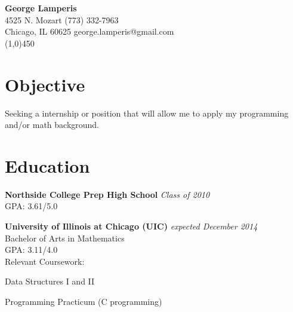 \documentclass[letterpaper]{article}
\begin{document}
\begin{center}
    \textbf{\LARGE{George Lamperis}} \\
    4525 N. Mozart      \hfill  (773) 332-7963  \\
    Chicago, IL 60625   \hfill  george.lamperis@gmail.com \\
    \line(1,0){450}
\end{center}

\section*{Objective}
Seeking a internship or position that will allow me to apply my programming 
and/or math background.

\section*{Education}
\textbf{Northside College Prep High School} \hfill \emph{Class of 2010} \\
GPA: 3.61/5.0

\textbf{University of Illinois at Chicago (UIC)} \hfill \emph{expected December 2014} \\
Bachelor of Arts in Mathematics \\
GPA: 3.11/4.0 \\
Relevant Coursework:
\vspace{-1ex}
\begin{compactitem}
    \item Data Structures I and II
    \item Programming Practicum (C programming)
\end{compactitem}


\end{document}
